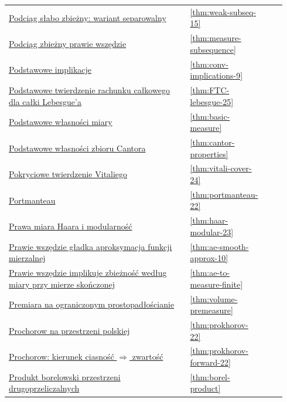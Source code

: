 \documentclass[11pt,a4paper,oneside]{book}
\numberwithin{equation}{chapter}
\theoremstyle{plain}
\theoremstyle{definition}
\theoremstyle{remark}
\begin{document}
\begin{longtable}{@{}p{0.72\linewidth}p{0.135\linewidth}p{0.08\linewidth}@{}}
\hyperref[thm:weak-subseq-15]{Podciąg słabo zbieżny: wariant separowalny} & \ref*{thm:weak-subseq-15} & \pageref*{thm:weak-subseq-15} \\
\hyperref[thm:measure-subsequence]{Podciąg zbieżny prawie wszędzie} & \ref*{thm:measure-subsequence} & \pageref*{thm:measure-subsequence} \\
\hyperref[thm:conv-implications-9]{Podstawowe implikacje} & \ref*{thm:conv-implications-9} & \pageref*{thm:conv-implications-9} \\
\hyperref[thm:FTC-lebesgue-25]{Podstawowe twierdzenie rachunku całkowego dla całki Lebesgue'a} & \ref*{thm:FTC-lebesgue-25} & \pageref*{thm:FTC-lebesgue-25} \\
\hyperref[thm:basic-measure]{Podstawowe własności miary} & \ref*{thm:basic-measure} & \pageref*{thm:basic-measure} \\
\hyperref[thm:cantor-properties]{Podstawowe własności zbioru Cantora} & \ref*{thm:cantor-properties} & \pageref*{thm:cantor-properties} \\
\hyperref[thm:vitali-cover-24]{Pokryciowe twierdzenie Vitaliego} & \ref*{thm:vitali-cover-24} & \pageref*{thm:vitali-cover-24} \\
\hyperref[thm:portmanteau-22]{Portmanteau} & \ref*{thm:portmanteau-22} & \pageref*{thm:portmanteau-22} \\
\hyperref[thm:haar-modular-23]{Prawa miara Haara i modularność} & \ref*{thm:haar-modular-23} & \pageref*{thm:haar-modular-23} \\
\hyperref[thm:ae-smooth-approx-10]{Prawie wszędzie gładka aproksymacja funkcji mierzalnej} & \ref*{thm:ae-smooth-approx-10} & \pageref*{thm:ae-smooth-approx-10} \\
\hyperref[thm:ae-to-measure-finite]{Prawie wszędzie implikuje zbieżność według miary przy mierze skończonej} & \ref*{thm:ae-to-measure-finite} & \pageref*{thm:ae-to-measure-finite} \\
\hyperref[thm:volume-premeasure]{Premiara na ograniczonym prostopadłościanie} & \ref*{thm:volume-premeasure} & \pageref*{thm:volume-premeasure} \\
\hyperref[thm:prokhorov-22]{Prochorow na przestrzeni polskiej} & \ref*{thm:prokhorov-22} & \pageref*{thm:prokhorov-22} \\
\hyperref[thm:prokhorov-forward-22]{Prochorow: kierunek ciasność $\Rightarrow$ zwartość} & \ref*{thm:prokhorov-forward-22} & \pageref*{thm:prokhorov-forward-22} \\
\hyperref[thm:borel-product]{Produkt borelowski przestrzeni drugoprzeliczalnych} & \ref*{thm:borel-product} & \pageref*{thm:borel-product} \\

\end{longtable}
\end{document}
